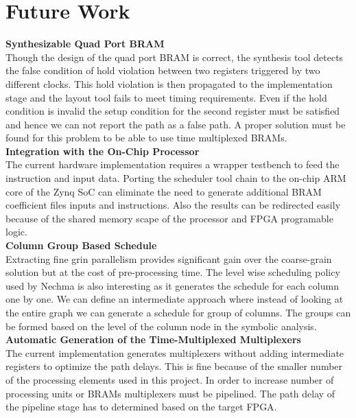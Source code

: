 \chapter{Future Work}
\vspace{-1.5cm}
\textbf{Synthesizable Quad Port BRAM}\\
Though the design of the quad port BRAM is correct, the synthesis tool
detects the false condition of hold violation between two registers triggered by 
two different clocks. This hold violation is then propagated to the 
implementation stage and the layout tool fails to meet timing requirements. Even if the 
hold condition is invalid the setup condition for the second register must be satisfied and hence we can not
report the path as a false path. A proper solution must be found for this problem to be able to use
time multiplexed BRAMs.
\\

\textbf{Integration with the On-Chip Processor}\\
The current hardware implementation requires a wrapper testbench to feed the instruction and 
input data. Porting the scheduler tool chain to the on-chip ARM core of the Zynq SoC
can eliminate the need to generate additional BRAM coefficient files inputs and instructions.
Also the results can be redirected easily because of the shared memory scape of the 
processor and FPGA programable logic.
\\

\textbf{Column Group Based Schedule}\\
Extracting fine grin parallelism provides significant gain over the coarse-grain solution
but at the cost of pre-processing time. The level wise scheduling policy used by Nechma \cite{Nechma}
is also interesting as it generates the schedule for each column one by one. We can define
an intermediate approach where instead of looking at the entire graph we can generate a schedule
for group of columns. The groups can be formed based on the level of the column node in the 
symbolic analysis.
\\

\textbf{Automatic Generation of the Time-Multiplexed Multiplexers}\\
The current implementation generates multiplexers without adding intermediate 
registers to optimize the path delays. This is fine because of the smaller number
of the processing elements used in this project. In order to increase number of processing
units or BRAMs multiplexers must be pipelined. The path delay of the pipeline
stage has to determined based on the target FPGA. 
